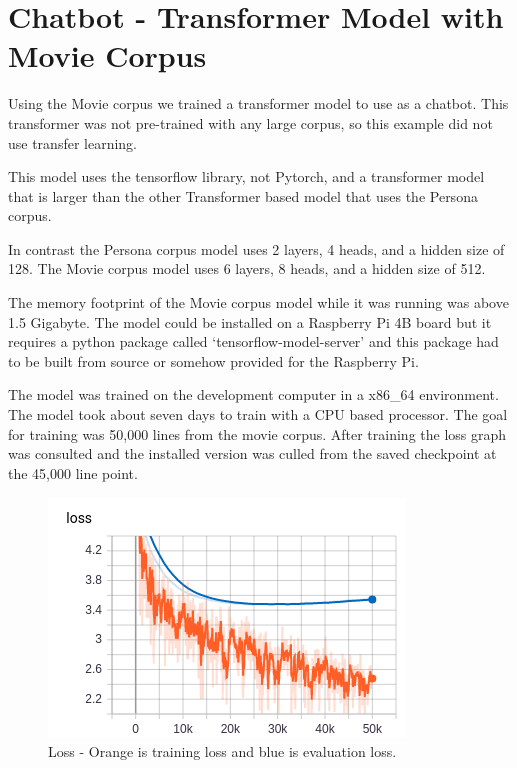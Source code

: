 \section{Chatbot - Transformer Model with Movie Corpus}
Using the Movie corpus we trained a transformer model to use as a chatbot. This transformer was not pre-trained with any large corpus, so this example did not use transfer learning. 

This model uses the tensorflow library, not Pytorch, and a transformer model that is larger than the other Transformer based model that uses the Persona corpus.

In contrast the Persona corpus model uses 2 layers, 4 heads, and a hidden size of 128. The Movie corpus model uses 6 layers, 8 heads, and a hidden size of 512.

The memory footprint of the Movie corpus model while it was running was above 1.5 Gigabyte. The model could be installed on a Raspberry Pi 4B board but it requires a python package called `tensorflow-model-server' and this package had to be built from source or somehow provided for the Raspberry Pi. 

The model was trained on the development computer in a x86\_64 environment. The model took about seven days to train with a CPU based processor. The goal for training was 50,000 lines from the movie corpus. After training the loss graph was consulted and the installed version was culled from the saved checkpoint at the 45,000 line point.


\begin{figure}[H]
	\begin{center}
		\includegraphics[scale=3.5]{Figure_2}
		
		
	\end{center}
	\caption[Loss - Larger Transformer Model]{Loss - Orange is training loss and blue is evaluation loss.}
	
\end{figure}

